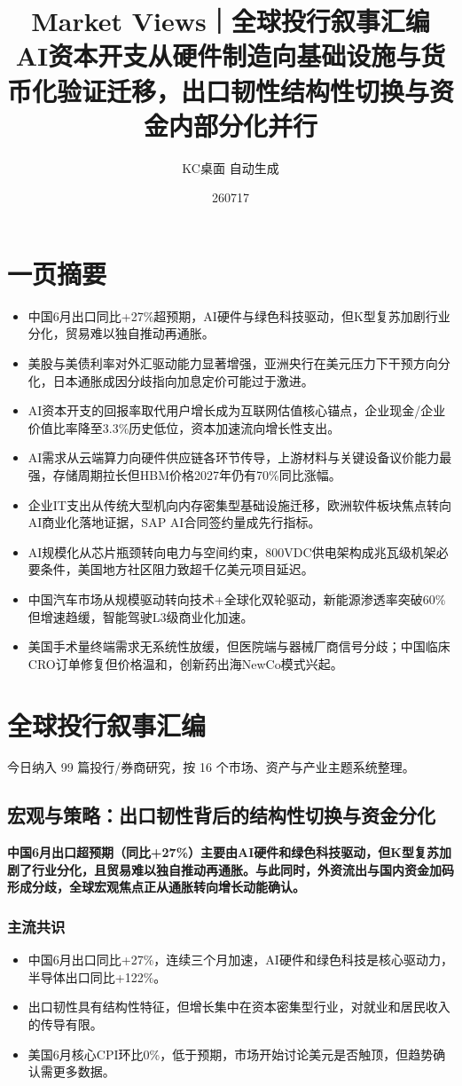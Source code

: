 \documentclass[11pt]{ctexart}
\title{\textbf{Market Views｜全球投行叙事汇编}\\[0.4em]{\large AI资本开支从硬件制造向基础设施与货币化验证迁移，出口韧性结构性切换与资金内部分化并行}}
\author{KC桌面 自动生成}
\date{260717}
\begin{document}
\maketitle
\tableofcontents
\newpage
\section{一页摘要}
\begin{itemize}
  \item 中国6月出口同比+27\%超预期，AI硬件与绿色科技驱动，但K型复苏加剧行业分化，贸易难以独自推动再通胀。
  \item 美股与美债利率对外汇驱动能力显著增强，亚洲央行在美元压力下干预方向分化，日本通胀成因分歧指向加息定价可能过于激进。
  \item AI资本开支的回报率取代用户增长成为互联网估值核心锚点，企业现金/企业价值比率降至3.3\%历史低位，资本加速流向增长性支出。
  \item AI需求从云端算力向硬件供应链各环节传导，上游材料与关键设备议价能力最强，存储周期拉长但HBM价格2027年仍有70\%同比涨幅。
  \item 企业IT支出从传统大型机向内存密集型基础设施迁移，欧洲软件板块焦点转向AI商业化落地证据，SAP AI合同签约量成先行指标。
  \item AI规模化从芯片瓶颈转向电力与空间约束，800VDC供电架构成兆瓦级机架必要条件，美国地方社区阻力致超千亿美元项目延迟。
  \item 中国汽车市场从规模驱动转向技术+全球化双轮驱动，新能源渗透率突破60\%但增速趋缓，智能驾驶L3级商业化加速。
  \item 美国手术量终端需求无系统性放缓，但医院端与器械厂商信号分歧；中国临床CRO订单修复但价格温和，创新药出海NewCo模式兴起。
\end{itemize}
\section{全球投行叙事汇编}
今日纳入 99 篇投行/券商研究，按 16 个市场、资产与产业主题系统整理。
\newpage
\subsection{宏观与策略：出口韧性背后的结构性切换与资金分化}
\textbf{中国6月出口超预期（同比+27\%）主要由AI硬件和绿色科技驱动，但K型复苏加剧了行业分化，且贸易难以独自推动再通胀。与此同时，外资流出与国内资金加码形成分歧，全球宏观焦点正从通胀转向增长动能确认。}
\subsubsection*{主流共识}
\begin{itemize}
  \item 中国6月出口同比+27\%，连续三个月加速，AI硬件和绿色科技是核心驱动力，半导体出口同比+122\%。
  \item 出口韧性具有结构性特征，但增长集中在资本密集型行业，对就业和居民收入的传导有限。
  \item 美国6月核心CPI环比0\%，低于预期，市场开始讨论美元是否触顶，但趋势确认需更多数据。
\end{itemize}
\end{document}
